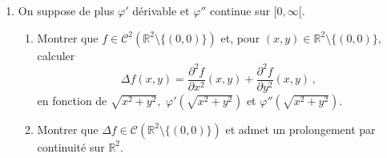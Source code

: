 \documentclass[a4paper]{tp_um}
\begin{document}
\begin{enumerate}
\item On suppose de plus $\varphi'$ d\'erivable et $\varphi''$ continue sur $[0,\infty[.$
\begin{enumerate}
\item Montrer que $f \in \mathcal C^2(\mathbb R^2 \setminus \{(0,0)\})$ et, pour $(x,y) \in \mathbb R^2 \setminus \{(0,0)\},$ 
calculer 
\[
\Delta f(x,y) = \dfrac{\partial^2 f}{\partial x^2} (x,y) + \dfrac{\partial^2 f}{\partial y^2} (x,y) \,, \
\]
en fonction de $\sqrt{x^2+y^2},$ $\varphi'(\sqrt{x^2+y^2})$ et $\varphi''(\sqrt{x^2+y^2}).$





\item Montrer que $\Delta f \in \mathcal C(\mathbb R^2 \setminus \{(0,0)\})$  et admet un prolongement
par continuit\'e sur $\mathbb R^2.$



\end{enumerate}

\end{enumerate}
\end{document}
